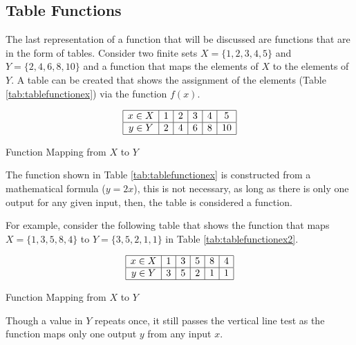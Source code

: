 \subsection{Table Functions}

The last representation of a function that will be discussed are functions that are in the form of tables. Consider two finite sets $X = \{1,2,3,4,5\}$ and $Y = \{2,4,6,8,10\}$ and a function that maps the elements of $X$ to the elements of $Y$. A table can be created that shows the assignment of the elements (Table \ref{tab:tablefunctionex}) via the function $f(x)$.

\begin{table}[!ht]
    \centering
    \[
        \begin{array}{|*{6}{c|}}
            \hline
            x \in X & 1 & 2 & 3 & 4 & 5 \\
            \hline
            y \in Y & 2 & 4 & 6 & 8 & 10 \\
            \hline
        \end{array}
    \]
    \caption{Function Mapping from \( X \) to \( Y \)}
    \label{tab:tablefunctionex}
\end{table}

The function shown in Table \ref{tab:tablefunctionex} is constructed from a mathematical formula ($y = 2x$), this is not necessary, as long as there is only one output for any given input, then, the table is considered a function.

\begin{example} For example, consider the following table that shows the function that maps $X = \{1,3,5,8,4\}$ to $Y = \{3,5,2,1,1\}$ in Table \ref{tab:tablefunctionex2}.
    \begin{table}[!ht]
        \centering
        \[
            \begin{array}{|*{6}{c|}}
                \hline
                x \in X & 1 & 3 & 5 & 8 & 4 \\
                \hline
                y \in Y & 3 & 5 & 2 & 1 & 1 \\
                \hline
            \end{array}
        \]
        \caption{Function Mapping from \( X \) to \( Y \)}
        \label{tab:tablefunctionex2}
    \end{table}
    Though a value in $Y$ repeats once, it still passes the vertical line test as the function maps only one output $y$ from any input $x$.
\end{example}

